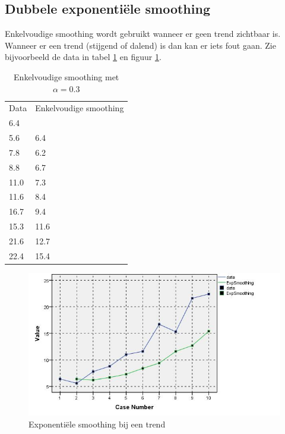 \subsection{Dubbele exponenti\"ele smoothing}
Enkelvoudige smoothing wordt gebruikt wanneer er geen trend zichtbaar is. Wanneer er een trend (stijgend of dalend) is dan kan er iets fout gaan. Zie bijvoorbeeld de data in tabel \ref{tab:trend} en figuur \ref{fig:tijdreeks61}.

\begin{table}
\centering
    \begin{tabular}{|ll|}
    \hline
    Data & Enkelvoudige smoothing \\
    6.4  & ~                      \\
    5.6  & 6.4                    \\
    7.8  & 6.2                    \\
    8.8  & 6.7                    \\
    11.0 & 7.3                    \\
    11.6 & 8.4                    \\
    16.7 & 9.4                    \\
    15.3 & 11.6                   \\
    21.6 & 12.7                   \\
    22.4 & 15.4                   \\ \hline
    \end{tabular}
		\caption{Enkelvoudige smoothing met $\alpha = 0.3$}
		\label{tab:trend}
\end{table}

\begin{figure}
	\centering
		\includegraphics[width=1.00\textwidth]{images/tijdsreeksen/tijdsreeks61.jpg}
	\caption{Exponenti\"ele smoothing bij een trend}
	\label{fig:tijdreeks61}
\end{figure}

